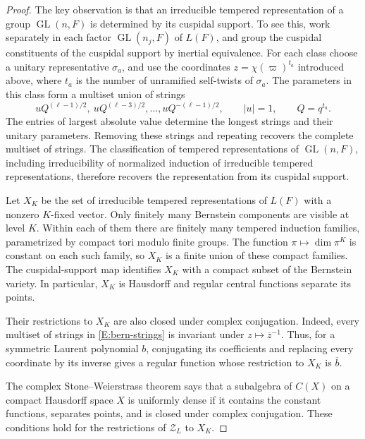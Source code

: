 \documentclass[11pt,a4paper]{amsart}
\newcommand{\mcZ}{\mathcal Z}
\theoremstyle{definition}
\theoremstyle{remark}
\DeclareMathOperator{\GL}{GL}
\begin{document}
\begin{proof}
The key observation is that an irreducible tempered representation of a
group $\GL(n,F)$ is determined by its cuspidal support. To see this,
work separately in each factor $\GL(n_j,F)$ of $L(F)$, and group the
cuspidal constituents of the cuspidal support by inertial equivalence.
For each class choose a unitary representative $\sigma_a$, and use the
coordinates $z=\chi(\varpi)^{t_a}$ introduced above, where $t_a$ is the
number of unramified self-twists of $\sigma_a$. The parameters in this
class form a multiset union of strings
\begin{equation}\label{E:bern-strings}
 uQ^{(\ell-1)/2},\ uQ^{(\ell-3)/2},\ldots,
 uQ^{-(\ell-1)/2},\qquad |u|=1,\qquad Q=q^{t_a}.
\end{equation}
The entries of largest absolute value determine the longest strings
and their unitary parameters. Removing these strings and repeating
recovers the complete multiset of strings. The classification of tempered
representations of $\GL(n,F)$, including irreducibility of
normalized induction of irreducible tempered representations, therefore
recovers the representation from its cuspidal support.

Let $X_K$ be the set of irreducible tempered representations of $L(F)$
with a nonzero $K$-fixed vector. Only finitely many Bernstein components
are visible at level $K$. Within each of them there are finitely many
tempered induction families, parametrized by compact tori modulo finite
groups. The function $\pi\mapsto\dim\pi^K$ is constant on each such
family, so $X_K$ is a finite union of these compact families.
The cuspidal-support map identifies $X_K$ with a compact subset of the
Bernstein variety. In particular, $X_K$ is Hausdorff and regular central
functions separate its points.

Their restrictions to $X_K$ are also closed under complex conjugation.
Indeed, every multiset of strings in \eqref{E:bern-strings} is invariant
under $z\mapsto\overline z^{-1}$. Thus, for a symmetric Laurent polynomial
$b$, conjugating its coefficients and replacing every coordinate by its
inverse gives a regular function whose restriction to $X_K$ is
$\overline b$.

The complex Stone--Weierstrass theorem says that a subalgebra of $C(X)$
on a compact Hausdorff space $X$ is uniformly dense if it contains the
constant functions, separates points, and is closed under complex
conjugation. These conditions hold for the restrictions of $\mcZ_L$
to $X_K$.


\end{proof}
\end{document}
